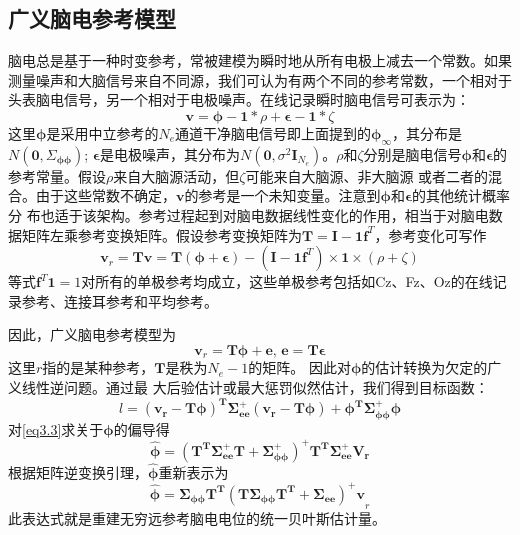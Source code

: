 \subsection{广义脑电参考模型}
脑电总是基于一种时变参考，常被建模为瞬时地从所有电极上减去一个常数。如果测量噪声和大脑信号来自不同源，我们可认为有两个不同的参考常数，一个相对于头表脑电信号，另一个相对于电极噪声。在线记录瞬时脑电信号可表示为：
\begin{equation}\label{eq3.1}
\mathbf{v}=\mathbf{\phi}-\mathbf{1}*\rho+\mathbf{\epsilon}-\mathbf{1}*\zeta
\end{equation}
这里$\mathbf{\phi}$是采用中立参考的$N_e$通道干净脑电信号即上面提到的$\mathbf{\phi}_{\infty}$，其分布是$N(\mathbf{0},\Sigma_{\mathbf{\phi}\mathbf{\phi}})$; $\mathbf{\epsilon}$是电极噪声，其分布为$N(\mathbf{0},\sigma^{2}\mathbf{I}_{N_{e}})$。$\rho$和$\zeta$分别是脑电信号$\mathbf{\phi}$和$\mathbf{\epsilon}$的参考常量。假设$\rho$来自大脑源活动，但$\zeta$可能来自大脑源、非大脑源
或者二者的混合。由于这些常数不确定，$\mathbf{v}$的参考是一个未知变量。注意到$\mathbf{\phi}$和$\mathbf{\epsilon}$的其他统计概率分
布也适于该架构。参考过程起到对脑电数据线性变化的作用，相当于对脑电数据矩阵左乘参考变换矩阵。假设参考变换矩阵为$\mathbf{T=I-1f}^T$，参考变化可写作
\begin{equation*}
\mathbf{v}_{r}=\mathbf{Tv}=\mathbf{T(\phi+\epsilon)}-(\mathbf{I-1f}^T)\times\mathbf{1}\times(\rho+\zeta)
\end{equation*}
等式$\mathbf{f}^T\mathbf{1}=1$对所有的单极参考均成立，这些单极参考包括如Cz、Fz、Oz的在线记录参考、连接耳参考和平均参考。

因此，广义脑电参考模型为
\begin{equation}\label{eq3.2}
\mathbf{v}_{r}=\mathbf{T\phi+e},\,\mathbf{e=T\epsilon}
\end{equation}
这里$r$指的是某种参考，$\mathbf{T}$是秩为$N_{e}-1$的矩阵。 因此对$\mathbf{\phi}$的估计转换为欠定的广义线性逆问题。通过最
大后验估计或最大惩罚似然估计，我们得到目标函数：
\begin{equation}\label{eq3.3}
l=\mathbf{(v_{r}-T\phi)^{T}\Sigma_{ee}^{+}(v_{r}-T\phi)+\phi^{T}\Sigma_{\phi\phi}^{+}\phi}
\end{equation}
对\eqref{eq3.3}求关于$\mathbf{\phi}$的偏导得
\begin{equation}
\hat{\mathbf{\phi}}=\mathbf{(T^T\Sigma_{ee}^{+}T+\Sigma_{\phi\phi}^{+})^{+}T^{T}\Sigma_{ee}^{+}V_{r}}
\end{equation}
根据矩阵逆变换引理，$\hat{\mathbf{\phi}}$重新表示为
\begin{equation}\label{eq3.4}
\hat{\mathbf{\phi}}=\mathbf{\Sigma_{\phi\phi}T^{T}(T\Sigma_{\phi\phi}T^{T}+\Sigma_{ee})^{+}v}_{r}
\end{equation}
此表达式就是重建无穷远参考脑电电位的统一贝叶斯估计量。

